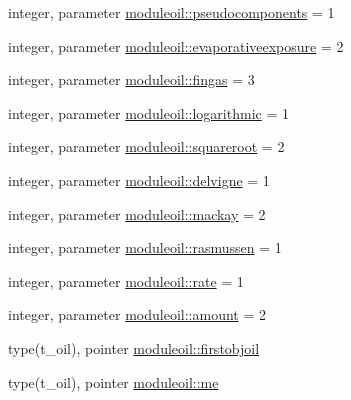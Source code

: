 \begin{DoxyCompactItemize}
\item 
integer, parameter \mbox{\hyperlink{namespacemoduleoil_a18fce47bd4924b7621307278097862ce}{moduleoil\+::pseudocomponents}} = 1
\item 
integer, parameter \mbox{\hyperlink{namespacemoduleoil_abfa265d4d464527590649fbc8833c4cc}{moduleoil\+::evaporativeexposure}} = 2
\item 
integer, parameter \mbox{\hyperlink{namespacemoduleoil_a3bcbe2b9305965ab2c0223d559521a7a}{moduleoil\+::fingas}} = 3
\item 
integer, parameter \mbox{\hyperlink{namespacemoduleoil_aadde4442048e01350a934a357e8954c7}{moduleoil\+::logarithmic}} = 1
\item 
integer, parameter \mbox{\hyperlink{namespacemoduleoil_abe60bae5ccf18abdda41e423a7c5daab}{moduleoil\+::squareroot}} = 2
\item 
integer, parameter \mbox{\hyperlink{namespacemoduleoil_a801bc9da7585a2b9fbc555af6b0f1567}{moduleoil\+::delvigne}} = 1
\item 
integer, parameter \mbox{\hyperlink{namespacemoduleoil_a1d25086a7015cf324c3af9b593a745db}{moduleoil\+::mackay}} = 2
\item 
integer, parameter \mbox{\hyperlink{namespacemoduleoil_a1f519bc3501a2da321237e65077b9b85}{moduleoil\+::rasmussen}} = 1
\item 
integer, parameter \mbox{\hyperlink{namespacemoduleoil_a3cd7562168c72c156b2f1f6e784a5ae3}{moduleoil\+::rate}} = 1
\item 
integer, parameter \mbox{\hyperlink{namespacemoduleoil_a648f61975720c552bfe6573b095ffa9e}{moduleoil\+::amount}} = 2
\item 
type(t\+\_\+oil), pointer \mbox{\hyperlink{namespacemoduleoil_a24a707e47b13ce99f1028c4db28223a3}{moduleoil\+::firstobjoil}}
\item 
type(t\+\_\+oil), pointer \mbox{\hyperlink{namespacemoduleoil_a70419f6d697dd70aed5f5dff114f475f}{moduleoil\+::me}}
\end{DoxyCompactItemize}
